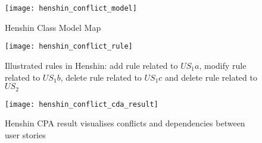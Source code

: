 \begin{example}
\begin{figure}
\center
\texttt{[image: henshin\_conflict\_model]}
\caption{Henshin Class Model Map}\label{fig:conflict_model}
\end{figure}
\begin{figure}
\center
\texttt{[image: henshin\_conflict\_rule]}
\caption{Illustrated rules in Henshin: add rule related to $US_1a$, modify rule related to $US_1b$, delete rule related to $US_1c$  and delete rule related to $US_2$ }\label{fig:conflict_rule}
\end{figure}
\begin{figure}
\center
\texttt{[image: henshin\_conflict\_cda\_result]}
\caption{Henshin CPA result visualises conflicts and dependencies between user stories}\label{fig:conflict_cda}
\end{figure}
\end{example}



